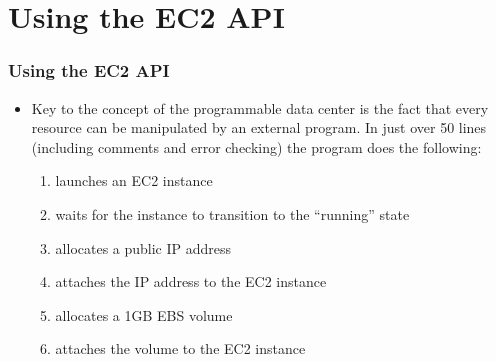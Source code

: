 \documentclass{beamer}
\begin{document}
\section{Using the EC2 API}
\begin{frame}[fragile]
\frametitle{Using the EC2 API}
\begin{itemize}
\item Key to the concept of the programmable data center is the fact that every resource
can be manipulated by an external program. In just over 50 lines (including comments and error
checking) the program does the following:
\begin{enumerate}
\item launches an EC2 instance
\item waits for the instance to transition to the ``running'' state
\item allocates a public IP address
\item attaches the IP address to the EC2 instance
\item allocates a 1GB EBS volume
\item attaches the volume to the EC2 instance
\end{enumerate}
\end{itemize}

\end{frame}
\end{document}
